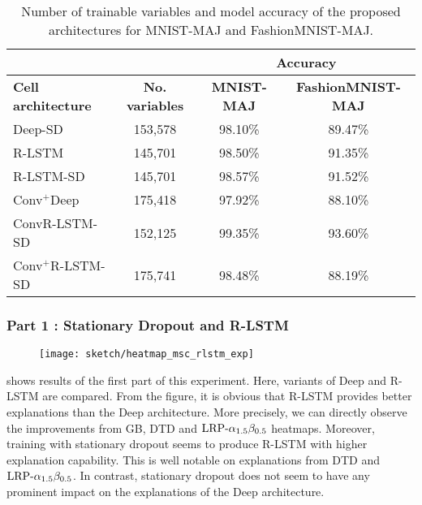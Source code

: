 \renewcommand{\arraystretch}{1.5}
\begin{table}[h]
\begin{center}
\begin{tabular}{lc|c|c|}
\cline{3-4}
& &
\multicolumn{2}{c|}{\parbox{3.5cm}{ \vskip 1mm \centering \textbf{Accuracy} \vskip 1mm}} \\ \hline
\multicolumn{1}{|l|}{\textbf{Cell architecture}} & \textbf{No. variables} & \textbf{MNIST-MAJ} & \textbf{FashionMNIST-MAJ} \\ \hline
\multicolumn{1}{|l|}{Deep-SD}                  & 153,578             & 98.10\% & 89.47\% \\ 
\multicolumn{1}{|l|}{R-LSTM}                    & 145,701   & 98.50\% & 91.35\% \\ 
\multicolumn{1}{|l|}{R-LSTM-SD}              &  145,701                & 98.57\% & 91.52\% \\ 
 \multicolumn{1}{|l|}{Conv$^+$Deep}       & 175,418                 & 97.92\% & 88.10\% \\
 \multicolumn{1}{|l|}{ConvR-LSTM-SD}      & 152,125                 & 99.35\% & 93.60\%  \\ 
\multicolumn{1}{|l|}{Conv$^+$R-LSTM-SD}   & 175,741                & 98.48\% & 88.19\%  \\ \hline 
\end{tabular}

\end{center}
\caption{Number of trainable variables and model accuracy of the  proposed architectures for MNIST-MAJ and FashionMNIST-MAJ.}
\label{tab:maj_exp3_model_acc}
\end{table}
\renewcommand{\arraystretch}{1}


\subsubsection{Part 1 : Stationary Dropout and R-LSTM}
 \begin{figure}[!htb]
\centering
\texttt{[image: sketch/heatmap\_msc\_rlstm\_exp]}
\label{fig:heatmap_msc_rlstm_exp}
\end{figure}

\addfigure{\ref{fig:heatmap_msc_rlstm_exp}} shows results of the first part of this experiment. Here, variants of Deep and R-LSTM are compared. From the figure, it is obvious that R-LSTM provides better explanations than the Deep architecture. More precisely, we can directly observe the improvements from GB, DTD and $\text{LRP-}\alpha_{1.5}\beta_{0.5}$ heatmaps. Moreover, training with stationary dropout seems to produce R-LSTM with higher explanation capability. This is well notable on explanations from  DTD and $\text{LRP-}\alpha_{1.5}\beta_{0.5}$. In contrast, stationary dropout does not seem to have any prominent impact on the explanations of the Deep architecture.



